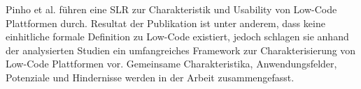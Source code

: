 Pinho et al. \cite{pinho2023usability} führen eine SLR zur Charakteristik und Usability von Low-Code Plattformen durch. 
Resultat der Publikation ist unter anderem, dass keine einhitliche formale Definition zu Low-Code existiert, jedoch 
schlagen sie anhand der analysierten Studien ein umfangreiches Framework zur Charakterisierung von Low-Code Plattformen vor. 
Gemeinsame Charakteristika, Anwendungsfelder, Potenziale und Hindernisse werden in der Arbeit zusammengefasst. 

